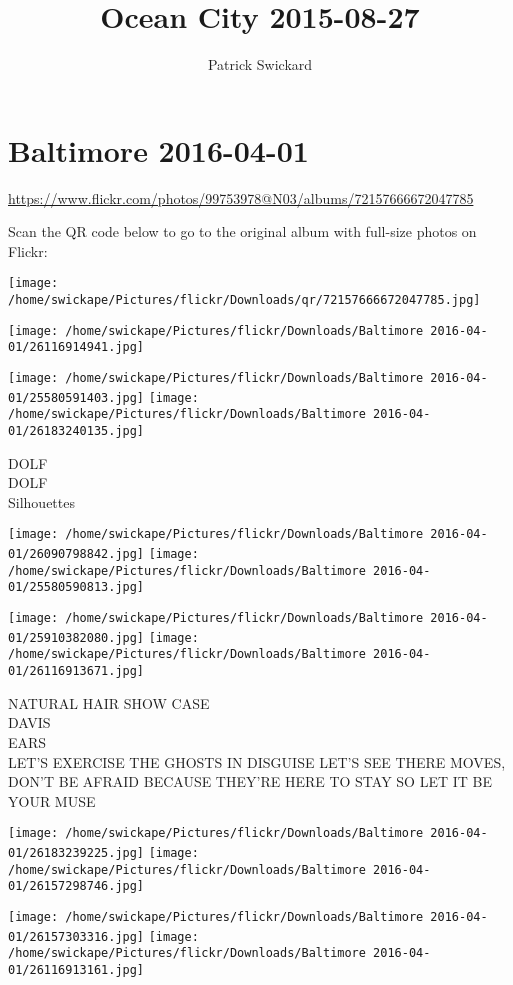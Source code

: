 \documentclass[10pt,letterpaper]{article}
\title{Ocean City 2015-08-27}
\author{Patrick Swickard}
\date{}
\begin{document}
\section*{Baltimore 2016-04-01}

\url{https://www.flickr.com/photos/99753978@N03/albums/72157666672047785}

Scan the QR code below to go to the original album with full-size photos on Flickr:

\texttt{[image: /home/swickape/Pictures/flickr/Downloads/qr/72157666672047785.jpg]}
\pagebreak

\texttt{[image: /home/swickape/Pictures/flickr/Downloads/Baltimore 2016-04-01/26116914941.jpg]}

\vspace{0.25in}
\texttt{[image: /home/swickape/Pictures/flickr/Downloads/Baltimore 2016-04-01/25580591403.jpg]}
\texttt{[image: /home/swickape/Pictures/flickr/Downloads/Baltimore 2016-04-01/26183240135.jpg]}

DOLF\\
DOLF\\
Silhouettes
\pagebreak

\texttt{[image: /home/swickape/Pictures/flickr/Downloads/Baltimore 2016-04-01/26090798842.jpg]}
\texttt{[image: /home/swickape/Pictures/flickr/Downloads/Baltimore 2016-04-01/25580590813.jpg]}

\texttt{[image: /home/swickape/Pictures/flickr/Downloads/Baltimore 2016-04-01/25910382080.jpg]}
\texttt{[image: /home/swickape/Pictures/flickr/Downloads/Baltimore 2016-04-01/26116913671.jpg]}

NATURAL HAIR SHOW CASE\\
DAVIS\\
EARS\\
LET'S EXERCISE THE GHOSTS IN DISGUISE LET'S SEE THERE MOVES, DON'T BE AFRAID BECAUSE THEY'RE HERE TO STAY SO LET IT BE YOUR MUSE
\pagebreak

\texttt{[image: /home/swickape/Pictures/flickr/Downloads/Baltimore 2016-04-01/26183239225.jpg]}
\texttt{[image: /home/swickape/Pictures/flickr/Downloads/Baltimore 2016-04-01/26157298746.jpg]}

\texttt{[image: /home/swickape/Pictures/flickr/Downloads/Baltimore 2016-04-01/26157303316.jpg]}
\texttt{[image: /home/swickape/Pictures/flickr/Downloads/Baltimore 2016-04-01/26116913161.jpg]}
\end{document}
